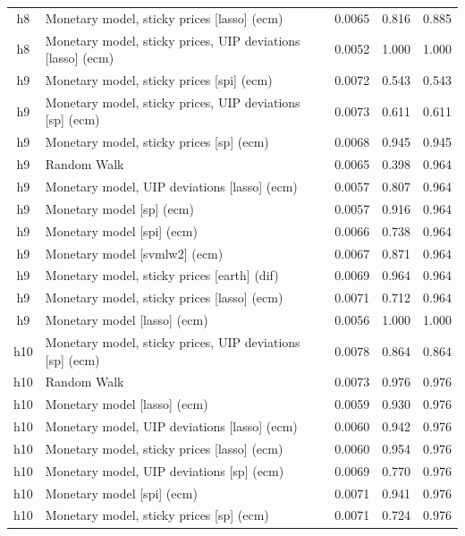 \begin{ThreePartTable}
\begin{longtable}[t]{cp{5.5cm}ccc}
h8 & \raggedright Monetary model, sticky prices [lasso] (ecm) & 0.0065 & 0.816 & 0.885\\
h8 & \raggedright Monetary model, sticky prices, UIP deviations [lasso] (ecm) & 0.0052 & 1.000 & 1.000\\
\addlinespace
h9 & \raggedright Monetary model, sticky prices [spi] (ecm) & 0.0072 & 0.543 & 0.543\\
h9 & \raggedright Monetary model, sticky prices, UIP deviations [sp] (ecm) & 0.0073 & 0.611 & 0.611\\
h9 & \raggedright Monetary model, sticky prices [sp] (ecm) & 0.0068 & 0.945 & 0.945\\
h9 & \raggedright Random Walk & 0.0065 & 0.398 & 0.964\\
h9 & \raggedright Monetary model, UIP deviations [lasso] (ecm) & 0.0057 & 0.807 & 0.964\\
h9 & \raggedright Monetary model [sp] (ecm) & 0.0057 & 0.916 & 0.964\\
h9 & \raggedright Monetary model [spi] (ecm) & 0.0066 & 0.738 & 0.964\\
h9 & \raggedright Monetary model [svmlw2] (ecm) & 0.0067 & 0.871 & 0.964\\
h9 & \raggedright Monetary model, sticky prices [earth] (dif) & 0.0069 & 0.964 & 0.964\\
h9 & \raggedright Monetary model, sticky prices [lasso] (ecm) & 0.0071 & 0.712 & 0.964\\
h9 & \raggedright Monetary model [lasso] (ecm) & 0.0056 & 1.000 & 1.000\\
\addlinespace
h10 & \raggedright Monetary model, sticky prices, UIP deviations [sp] (ecm) & 0.0078 & 0.864 & 0.864\\
h10 & \raggedright Random Walk & 0.0073 & 0.976 & 0.976\\
h10 & \raggedright Monetary model [lasso] (ecm) & 0.0059 & 0.930 & 0.976\\
h10 & \raggedright Monetary model, UIP deviations [lasso] (ecm) & 0.0060 & 0.942 & 0.976\\
h10 & \raggedright Monetary model, sticky prices [lasso] (ecm) & 0.0060 & 0.954 & 0.976\\
h10 & \raggedright Monetary model, UIP deviations [sp] (ecm) & 0.0069 & 0.770 & 0.976\\
h10 & \raggedright Monetary model [spi] (ecm) & 0.0071 & 0.941 & 0.976\\
h10 & \raggedright Monetary model, sticky prices [sp] (ecm) & 0.0071 & 0.724 & 0.976\\

\end{longtable}
\end{ThreePartTable}
